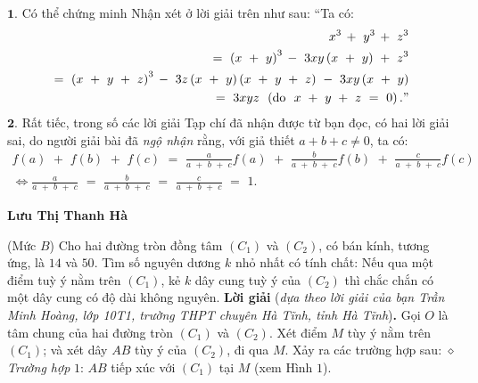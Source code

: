 \begin{multicols}{2}
	\vskip 0.05cm
	$\pmb{1.}$ Có thể chứng minh Nhận xét ở lời giải trên như sau:
	``Ta có:
	\begin{align*}
			\,\,\,\,\,{x^3}\, + \,\,{y^3}\, + \,\,{z^3}\\
			= \,\,{\left( {x\,\, + \,\,y} \right)^3}\, - \,\,3xy\left( {x\,\, + \,\,y} \right)\,\, + \,\,{z^3}\\
			= \,\,{\left( {x\,\, + \,\,y\,\, + \,\,z} \right)^3}\, - \,\,3z\left( {x\,\, + \,\,y} \right)\left( {x\,\, + \,\,y\,\, + \,\,z} \right)\,\, - \,\,3xy\left( {x\,\, + \,\,y} \right)\\
			= \,\,3xyz\,\,\,\left( {{\text{do }}\,\,x\,\, + \,\,y\,\, + \,\,z\,\, = \,\,0} \right)."
	\end{align*}
	$\pmb{2.}$ Rất tiếc, trong số các lời giải Tạp chí đã nhận được từ bạn đọc, có hai lời giải sai, do người giải bài đã \textit{ngộ nhận} rằng, với giả thiết $a + b + c \ne 0$, ta có:
	\begin{align*}
		f\left( a \right)\,\, + \,\,f\left( b \right)\,\, + \,\,f\left( c \right)\,\, = \,\,\frac{a}{{a\,\, + \,\,b\,\, + \,\,c}}f\left( a \right)\,\, + \,\,\frac{b}{{a\,\, + \,\,b\,\, + \,\,c}}f\left( b \right)\,\, + \,\,\frac{c}{{a\,\, + \,\,b\,\, + \,\,c}}f\left( c \right)\\
		\Leftrightarrow \frac{a}{{a\,\, + \,\,b\,\, + \,\,c}}\,\, = \,\,\frac{b}{{a\,\, + \,\,b\,\, + \,\,c}}\,\, = \,\,\frac{c}{{a\,\, + \,\,b\,\, + \,\,c}}\,\, = \,\,1.
	\end{align*}
	\begin{flushright}
		\textbf{Lưu Thị Thanh Hà}
	\end{flushright}
	{}
	(Mức $B$) Cho hai đường tròn đồng tâm $(C_1)$ và $(C_2)$, có bán kính, tương ứng, là $14$ và $50$. Tìm số nguyên dương $k$ nhỏ nhất có tính chất: Nếu qua một điểm tuỳ ý nằm trên $(C_1)$, kẻ $k$ dây cung tuỳ ý của $(C_2)$ thì chắc chắn có một dây cung có độ dài không nguyên. 
	\vskip 0.05cm
	\textbf{Lời giải} (\textit{dựa theo lời giải của bạn Trần Minh Hoàng, lớp 10T1, trường THPT chuyên Hà Tĩnh, tỉnh Hà Tĩnh})\textbf{.}
	\vskip 0.05cm
	Gọi $O$ là tâm chung của hai đường tròn $(C_1)$ và $(C_2)$.
	\vskip 0.05cm 
	Xét điểm $M$ tùy ý nằm trên  $(C_1)$; và xét dây $AB$ tùy ý của $(C_2)$, đi qua $M$. Xảy ra các trường hợp sau:
	\vskip 0.05cm
	$\diamond$ \textit{Trường hợp} $1$: $AB$ tiếp xúc với  $(C_1)$ tại $M$ (xem Hình $1$).
	\begin{figure}[H]
		\vspace*{-5pt}
		\centering
		\captionsetup{labelformat= empty, justification=centering}

\end{figure}
\end{multicols}
